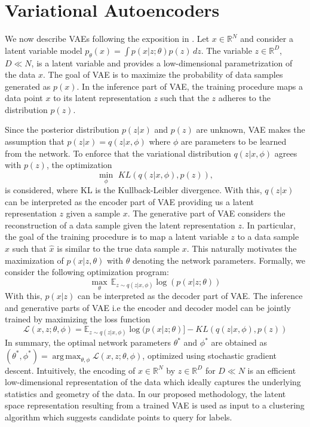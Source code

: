 \documentclass{article}
\def\R{{\mathbb R}}
\def\E{{\mathbb E}}
\DeclareMathOperator*{\argmax}{arg\,max}
\begin{document}

\section{Variational Autoencoders }

We now describe VAEs following the exposition in \cite{yang2018geodesic}. Let $x \in \R^N $ and consider a latent variable model $p_{\theta}(x) = \int p(x|z;\theta)p(z)\,dz$. The variable $z\in \R^{D}$, $D\ll N$, is a latent variable and provides a low-dimensional parametrization of the data $x$. The goal of VAE is to maximize the probability of  data samples generated as $p(x)$. In the inference part of VAE, the training procedure maps a data point $x$  to its latent representation $z$ such that the $z$ adheres to the distribution $p(z)$. 

Since the posterior distribution $p(z|x)$ and $p(z)$ are unknown, VAE makes the assumption that $p(z|x) = q(z|x,\phi)$ where $\phi$ are parameters to be learned from the network. To enforce that the variational distribution $q(z|x,\phi)$ agrees with $p(z)$, the optimization \[\min_{\phi}\,\, KL(q(z|x,\phi),p(z)),\] is considered, where KL is the Kullback-Leibler divergence.  With this, $q(z|x)$ can be interpreted as the encoder part of VAE providing us a latent representation $z$ given a sample $x$. The generative part of VAE considers the reconstruction of a data sample given the latent representation $z$. In particular, the goal of the training procedure is to map a latent variable $z$ to a data sample $\hat{x}$ such that $\hat{x}$ is similar to the true data sample $x$. This naturally motivates the maximization of $p(x|z,\theta)$ with $\theta$ denoting the network parameters. Formally, we consider the following optimization program:
\[
\max_{\theta}\, \E_{z \sim q(z|x,\phi)} \log(p(x|z;\theta))
\]
With this, $p(x|z)$ can be interpreted as the decoder part of VAE. The inference and generative parts of VAE i.e the encoder and decoder model can be jointly trained by maximizing the loss function $$\mathcal{L}(x,z;\theta,\phi)
=  \E_{z\sim q(z|x,\phi)} \log(p(x|z;\theta)] - KL(q(z|x,\phi),p(z))$$ In summary, the optimal network parameters $\theta^{*}$ and $\phi^{*}$ are obtained as $(\theta^{*},\phi^{*})=\argmax_{\theta,\phi} \mathcal{L}(x,z;\theta,\phi)$, optimized using stochastic gradient descent.  Intuitively, the encoding of $x\in\mathbb{R}^{N}$ by $z\in\mathbb{R}^{D}$ for $D\ll N$ is an efficient low-dimensional representation of the data which ideally captures the underlying statistics and geometry of the data.  In our proposed methodology, the latent space representation resulting from a trained VAE is used as input to a clustering algorithm which suggests candidate points to query for labels.
\end{document}
